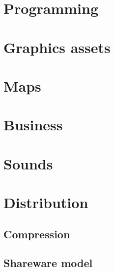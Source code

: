 \documentclass[book.tex]{subfiles}
\begin{document}
\section{Programming}
\section{Graphics assets}
\section{Maps}
\section{Business}
\section{Sounds}
\section{Distribution}
	\subsection{Compression}
	\subsection{Shareware model}
\end{document}
